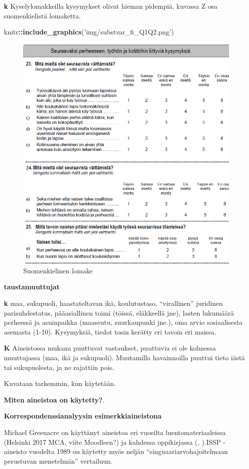 \documentclass[
  finnish,
]{book}
\newenvironment{Shaded}{\begin{snugshade}}{\end{snugshade}}
\newcommand{\KeywordTok}[1]{\textcolor[rgb]{0.13,0.29,0.53}{\textbf{#1}}}
\newcommand{\NormalTok}[1]{#1}
\newcommand{\OperatorTok}[1]{\textcolor[rgb]{0.81,0.36,0.00}{\textbf{#1}}}
\newcommand{\StringTok}[1]{\textcolor[rgb]{0.31,0.60,0.02}{#1}}
\begin{document}
\textbf{k} Kyselylomakkeilla kysymykset olivat hieman pidempiä, kuvassa Z osa suomenkielistä
lomaketta.

\begin{Shaded}
\begin{Highlighting}[]
\NormalTok{knitr}\OperatorTok{::}\KeywordTok{include_graphics}\NormalTok{(}\StringTok{'img/substvar_fi_Q1Q2.png'}\NormalTok{)}
\end{Highlighting}
\end{Shaded}

\begin{figure}

{\centering \includegraphics[width=0.5\linewidth]{img/substvar_fi_Q1Q2} 

}

\caption{Suomenkielinen lomake}\label{fig:suom-kys}
\end{figure}

\textbf{taustamuuttujat}

\textbf{k} maa, sukupuoli, haastateltavan ikä, koulutustaso, ``virallinen'' juridinen parisuhdestatus,
pääasiallinen toimi (töissä, eläkkeellä jne), lasten lukumäärä perheessä ja asuinpaikka (maaseutu,
suurkaupunki jne.), oma arvio sosiaalisesta asemasta (1-10). Kysymyksiä, tiedot tosin
kerätty eri tavoin eri maissa.

\textbf{K} Aineistossa mukana puuttuvat vastaukset, puuttuvia ei ole kolmessa muuttujassa
(maa, ikä ja sukupuoli). Muutamilla havainnoilla puuttui tieto iästä tai sukupuolesta,
ja ne rajattiin pois.

Kuvataan tarkemmin, kun käytetään.

\textbf{Miten aineistoa on käytetty?}.

\textbf{Korrespondenssianalyysin esimerkkiaineistona}

Michael Greenacre on käyttänyt aineistoa eri vuosilta luentomateriaaleissa (Helsinki 2017 MCA, viite Moodleen?) ja kahdessa oppikirjassa (\citep{RefWorks:doc:5a857a43e4b0ed2d44664d7c}, \citep{RefWorks:doc:5a857a43e4b0ed2d44664d78}).ISSP - aineisto vuodelta 1989 on käytetty myös neljän ``singuaariarvohajoitelmaan perustuvan menetelmän'' vertailuun\citep{RefWorks:doc:5b6f159ce4b0bc0f31734b76}.
\end{document}
